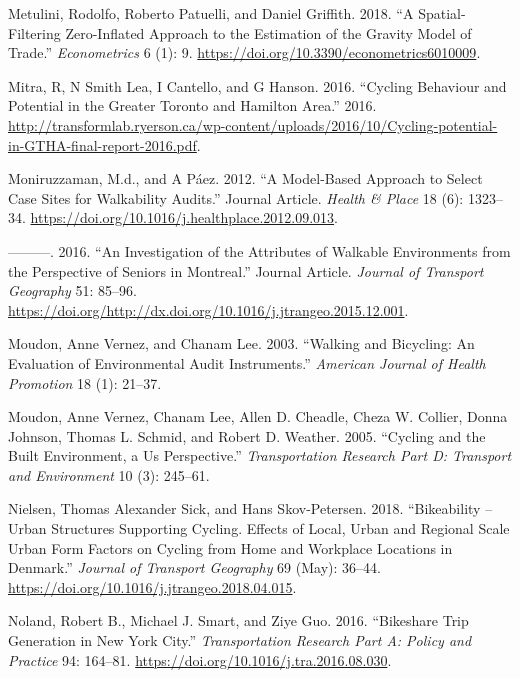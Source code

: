 \documentclass[smallextended]{svjour3}       %
\begin{document}
\leavevmode\hypertarget{ref-Metulini2018}{}%
Metulini, Rodolfo, Roberto Patuelli, and Daniel Griffith. 2018. ``A
Spatial-Filtering Zero-Inflated Approach to the Estimation of the
Gravity Model of Trade.'' \emph{Econometrics} 6 (1): 9.
\url{https://doi.org/10.3390/econometrics6010009}.

\leavevmode\hypertarget{ref-Mitra2016}{}%
Mitra, R, N Smith Lea, I Cantello, and G Hanson. 2016. ``Cycling
Behaviour and Potential in the Greater Toronto and Hamilton Area.''
2016.
\url{http://transformlab.ryerson.ca/wp-content/uploads/2016/10/Cycling-potential-in-GTHA-final-report-2016.pdf}.

\leavevmode\hypertarget{ref-Moniruzzaman2012}{}%
Moniruzzaman, M.d., and A Páez. 2012. ``A Model-Based Approach to Select
Case Sites for Walkability Audits.'' Journal Article. \emph{Health \&
Place} 18 (6): 1323--34.
\url{https://doi.org/10.1016/j.healthplace.2012.09.013}.

\leavevmode\hypertarget{ref-Moniruzzaman2016}{}%
---------. 2016. ``An Investigation of the Attributes of Walkable
Environments from the Perspective of Seniors in Montreal.'' Journal
Article. \emph{Journal of Transport Geography} 51: 85--96.
\url{https://doi.org/http://dx.doi.org/10.1016/j.jtrangeo.2015.12.001}.

\leavevmode\hypertarget{ref-Moudon2003walking}{}%
Moudon, Anne Vernez, and Chanam Lee. 2003. ``Walking and Bicycling: An
Evaluation of Environmental Audit Instruments.'' \emph{American Journal
of Health Promotion} 18 (1): 21--37.

\leavevmode\hypertarget{ref-moudonCyclingBuiltEnvironment2005a}{}%
Moudon, Anne Vernez, Chanam Lee, Allen D. Cheadle, Cheza W. Collier,
Donna Johnson, Thomas L. Schmid, and Robert D. Weather. 2005. ``Cycling
and the Built Environment, a Us Perspective.'' \emph{Transportation
Research Part D: Transport and Environment} 10 (3): 245--61.

\leavevmode\hypertarget{ref-Nielsen2018}{}%
Nielsen, Thomas Alexander Sick, and Hans Skov-Petersen. 2018.
``Bikeability -- Urban Structures Supporting Cycling. Effects of Local,
Urban and Regional Scale Urban Form Factors on Cycling from Home and
Workplace Locations in Denmark.'' \emph{Journal of Transport Geography}
69 (May): 36--44. \url{https://doi.org/10.1016/j.jtrangeo.2018.04.015}.

\leavevmode\hypertarget{ref-nolandBikeshareTripGeneration2016}{}%
Noland, Robert B., Michael J. Smart, and Ziye Guo. 2016. ``Bikeshare
Trip Generation in New York City.'' \emph{Transportation Research Part
A: Policy and Practice} 94: 164--81.
\url{https://doi.org/10.1016/j.tra.2016.08.030}.
\end{document}
